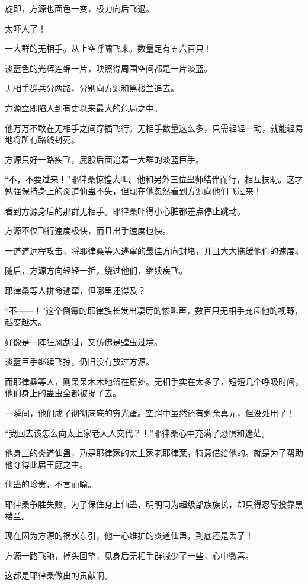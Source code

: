 \begin{this_body}
旋即，方源也面色一变，极力向后飞退。

太吓人了！

一大群的无相手。从上空呼啸飞来。数量足有五六百只！

淡蓝色的光辉连绵一片，映照得周围空间都是一片淡蓝。

无相手群兵分两路，分别向方源和黑楼兰追去。

方源立即陷入到有史以来最大的危局之中。

他万万不敢在无相手之间穿插飞行。无相手数量这么多，只需轻轻一动，就能轻易地将所有路线封死。

方源只好一路疾飞，屁股后面追着一大群的淡蓝巨手。

“不，不要过来！”耶律桑惊惶大叫。他和另外三位蛊师结伴而行，相互扶助。这才勉强保持身上的炎道仙蛊不失，但现在他忽然看到方源向他们飞过来！

看到方源身后的那群无相手。耶律桑吓得小心脏都差点停止跳动。

方源不仅飞行速度极快，而且出手速度也快。

一道道远程攻击，将耶律桑等人逃窜的最佳方向封堵，并且大大拖缓他们的速度。

随后，方源方向轻轻一折，绕过他们，继续疾飞。

耶律桑等人拼命逃窜，但哪里还得及？

“不——！”这个倒霉的耶律族长发出凄厉的惨叫声，数百只无相手充斥他的视野，越变越大。

好像是一阵狂风刮过，又仿佛是蝗虫过境。

淡蓝巨手继续飞掠，仍旧没有放过方源。

而耶律桑等人，则呆呆木木地留在原处。无相手实在太多了，短短几个呼吸时间，他们身上的蛊虫全都被捉了去。

一瞬间，他们成了彻彻底底的穷光蛋。空窍中虽然还有剩余真元，但没处用了！

“我回去该怎么向太上家老大人交代？！”耶律桑心中充满了恐惧和迷茫。

他身上的炎道仙蛊，乃是耶律家的太上家老耶律莱，特意借给他的。就是为了帮助他夺得此届王庭之主。

仙蛊的珍贵，不言而喻。

耶律桑争胜失败，为了保住身上仙蛊，明明同为超级部族族长，却只得忍辱投靠黑楼兰。

现在因为方源的祸水东引，他一心维护的炎道仙蛊，到底还是丢了！

方源一路飞驰，掉头回望，见身后无相手群减少了一些，心中微喜。

这都是耶律桑做出的贡献啊。


\end{this_body}
